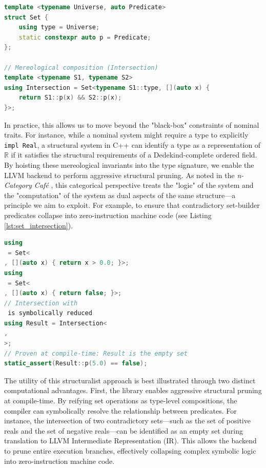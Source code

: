 \documentclass[11pt, a4paper]{report}
\begin{document}
\begin{lstlisting}[language=C++, caption={A simplified illustration of a set intersection implementation in \texttt{C++} in the structuralist, mereological style.}, label={lst:set_intersection}]
template <typename Universe, auto Predicate>
struct Set {
    using type = Universe;
    static constexpr auto p = Predicate;
};

// Mereological composition (Intersection)
template <typename S1, typename S2>
using Intersection = Set<typename S1::type, [](auto x) {
    return S1::p(x) && S2::p(x);
}>;
\end{lstlisting}

In practice, this allows us to move beyond the "black-box" constraints of nominal traits. For instance, while a nominal system might require a type to explicitly \texttt{impl Real}, a structural system in C++ can identify a type as a representation of $\mathbb{R}$ if it satisfies the structural requirements of a Dedekind-complete ordered field.
By hoisting these mereological invariants into the type signature, we enable the LLVM backend to perform aggressive structural pruning. As noted in the \emph{n-Category Café} \cite{ncategorycafe}, this categorical perspective treats the "logic" of the system and the "computation" of the system as dual aspects of the same structure—a principle we aim to exploit. 
For example, to ensure that contradictory set-builder predicates collapse into zero-instruction machine code (see Listing \ref{lst:set_intersection}).

\begin{lstlisting}[language=C++, caption={Compile-time reduction of contradictory set intersections.}]
using 
 = Set<
, [](auto x) { return x > 0.0; }>;
using 
 = Set<
, [](auto x) { return false; }>;
// Intersection with 
 is symbolically reduced
using Result = Intersection<
, 
>;
// Proven at compile-time: Result is the empty set
static_assert(Result::p(5.0) == false);
\end{lstlisting}


The utility of this structuralist approach is best illustrated through two distinct computational advantages.
First, the library enables aggressive structural pruning at compile-time.
By reifying set operations as type-level compositions, the compiler can symbolically resolve the relationship between predicates.
For instance, the intersection of two contradictory sets—such as the set of positive reals and the set of negative reals—can be identified as an empty set during translation to \textsc{LLVM} Intermediate Representation (IR).
This allows the backend to prune entire execution branches, effectively collapsing complex symbolic logic into zero-instruction machine code.
\end{document}
